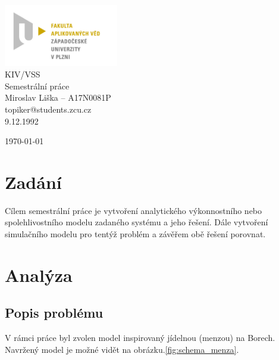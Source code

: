 \documentclass{article}
\begin{document}


\begin{titlepage}	
	\begin{center}
		\includegraphics[width=5cm]{logo.jpg}\\[3.5cm]
		{\Huge KIV/VSS}\\[0.5cm]
		{\Large Semestrální práce}\\[0.5cm]
		{\large  Miroslav Liška – A17N0081P}\\[0.5cm]
		{\large  topiker@students.zcu.cz}\\[0.5cm]
		{\large   9.12.1992}\\[0.5cm]
		\vfill

		{\large \today}

	\end{center}
\end{titlepage}



\section{Zadání} %
\setcounter{page}{1}
Cílem semestrální práce je vytvoření analytického výkonnostního nebo spolehlivostního modelu zadaného systému a jeho řešení.
 Dále vytvoření simulačního modelu pro tentýž problém a závěřem obě řešení porovnat.


\section{Analýza}

\subsection{Popis problému}
V rámci práce byl zvolen model inspirovaný jídelnou (menzou) na Borech. Navržený model je možné vidět na obrázku.\ref{fig:schema_menza}.
\end{document}
